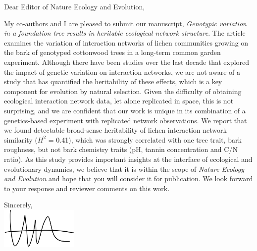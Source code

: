 \documentclass[12pt, a4paper]{letter} %
\begin{document}

\begin{letter}{

}


\opening{Dear Editor of Nature Ecology and Evolution,}


My co-authors and I are pleased to submit our manuscript,
\textit{Genotypic variation in a foundation tree results in heritable
  ecological network structure}. The article examines the variation of
interaction networks of lichen communities growing on the bark of
genotyped cottonwood trees in a long-term common garden
experiment. Although there have been studies over the last decade that
explored the impact of genetic variation on interaction networks, we
are not aware of a study that has quantified the heritability of these
effects, which is a key component for evolution by natural
selection. Given the difficulty of obtaining ecological interaction
network data, let alone replicated in space, this is not surprising,
and we are confident that our work is unique in its combination of a
genetics-based experiment with replicated network observations. We
report that we found detectable broad-sense heritability of lichen
interaction network similarity ($H^2$ = 0.41), which was strongly
correlated with one tree trait, bark roughness, but not bark chemistry
traits (pH, tannin concentration and C/N ratio). As this study
provides important insights at the interface of ecological and
evolutionary dynamics, we believe that it is within the scope of
\textit{Nature Ecology and Evolution} and hope that you will consider
it for publication. We look forward to your response and reviewer
comments on this work.


\closing{Sincerely, \\
  \hbox{\hspace{-10cm}}
\includegraphics[height=2cm]{mkl_sig.pdf}  
}




\end{letter}
\end{document}

